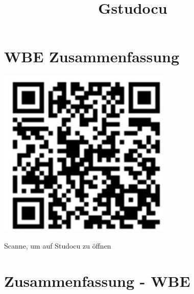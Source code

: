 \documentclass[10pt]{article}
\title{Gstudocu }
\author{}
\date{}
\begin{document}
\maketitle
\section*{WBE Zusammenfassung}
\begin{center}
\includegraphics[width=\linewidth]{images/2024_12_29_858f09cde51177c71657g-01}
\end{center}

Scanne, um auf Studocu zu öffnen

\section*{Zusammenfassung - WBE}
\end{document}
